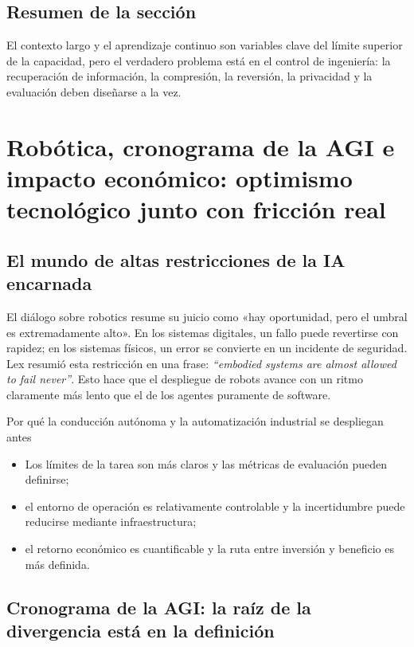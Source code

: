 \documentclass[a4paper]{article}
\begin{document}
\subsection{Resumen de la sección}

El contexto largo y el aprendizaje continuo son variables clave del límite superior de la capacidad, pero el verdadero problema está en el control de ingeniería: la recuperación de información, la compresión, la reversión, la privacidad y la evaluación deben diseñarse a la vez.

\section{Robótica, cronograma de la AGI e impacto económico: optimismo tecnológico junto con fricción real}

\subsection{El mundo de altas restricciones de la IA encarnada}

El diálogo sobre robotics resume su juicio como «hay oportunidad, pero el umbral es extremadamente alto». En los sistemas digitales, un fallo puede revertirse con rapidez; en los sistemas físicos, un error se convierte en un incidente de seguridad. Lex resumió esta restricción en una frase: \textit{``embodied systems are almost allowed to fail never''}. Esto hace que el despliegue de robots avance con un ritmo claramente más lento que el de los agentes puramente de software.

\begin{importantbox}{Por qué la conducción autónoma y la automatización industrial se despliegan antes}
\begin{itemize}[leftmargin=1.5em]
    \item Los límites de la tarea son más claros y las métricas de evaluación pueden definirse;
    \item el entorno de operación es relativamente controlable y la incertidumbre puede reducirse mediante infraestructura;
    \item el retorno económico es cuantificable y la ruta entre inversión y beneficio es más definida.
\end{itemize}
\end{importantbox}

\subsection{Cronograma de la AGI: la raíz de la divergencia está en la definición}
\end{document}
